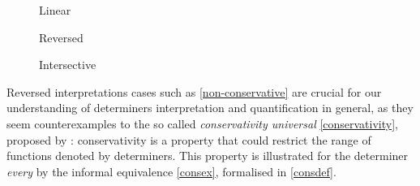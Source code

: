\documentclass[charis, linguex]{glossa}
\begin{document}
\begin{figure}[h!]
\RawFloats
\begin{minipage}[t]{0.3\textwidth}
\def\first{(0,0) ellipse (3.5em and 2.5em)}
  \def\second{(1.5,0) ellipse (3.5em and 2.5em)}
  \caption{Linear}\label{fig1}
\end{minipage}
\hfill
\begin{minipage}[t]{0.3\textwidth}
 \def\first{(0,0) ellipse (3.5em and 2.5em)}
  \def\second{(1.5,0) ellipse (3.5em and 2.5em)}
  \caption{Reversed}\label{fig2}
\end{minipage}
\hfill
\begin{minipage}[t]{0.3\textwidth}
  \def\first{(0,0) ellipse (3.5em and 2.5em)}
   \def\second{(1.5,0) ellipse (3.5em and 2.5em)}
   \caption{Intersective}\label{fig3}
\end{minipage}
\end{figure}



Reversed interpretations cases such as \ref{non-conservative} are crucial for our understanding of determiners interpretation and quantification in general, as they seem counterexamples to the so called \textit{conservativity universal} \ref{conservativity}, proposed by \citet[260]{kee86}: conservativity is a property that could restrict the range of functions denoted by determiners. This property is illustrated for the determiner \textit{every} by the informal equivalence \ref{consex}, formalised in \ref{consdef}.
\end{document}
